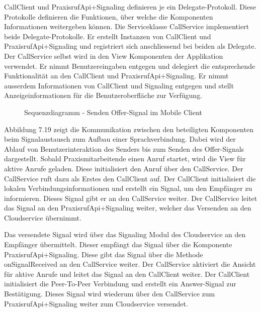 CallClient und PraxisrufApi+Signaling definieren je ein Delegate-Protokoll.
Diese Protokolle definieren die Funktionen, über welche die Komponenten Informationen weitergeben können.
Die Serviceklasse CallService implementiert beide Delegate-Protokolle.
Er erstellt Instanzen von CallClient und PraxisrufApi+Signaling und registriert sich anschliessend bei beiden als Delegate.
Der CallService selbst wird in den View Komponenten der Applikation verwendet.
Er nimmt Benutzereingaben entgegen und delegiert die entsprechende Funktionalität an den CallClient und PraxisrufApi+Signaling.
Er nimmt ausserdem Informationen von CallClient und Signaling entgegen und stellt Anzeigeinformationen für die Benutzeroberfläche zur Verfügung.
\clearpage
\begin{figure}[h]
    \centering
    \begin{minipage}[b]{0.9\textwidth}
        \caption{Sequenzdiagramm - Senden Offer-Signal im Mobile Client}
    \end{minipage}
\end{figure}

Abbildung 7.19 zeigt die Kommunikation zwischen den beteiligten Komponenten beim Signalaustausch zum Aufbau einer Sprachverbindung.
Dabei wird der Ablauf von Benutzerinteraktion des Senders bis zum Senden des Offer-Signals dargestellt.
Sobald Praxismitarbeitende einen Anruf startet, wird die View für aktive Anrufe geladen.
Diese initialisiert den Anruf über den CallService.
Der CallService ruft dazu als Erstes den CallClient auf.
Der CallClient initialisiert die lokalen Verbindungsinformationen und erstellt ein Signal, um den Empfänger zu informieren.
Dieses Signal gibt er an den CallService weiter.
Der CallService leitet das Signal an den PraxisrufApi+Signaling weiter, welcher das Versenden an den Cloudservice übernimmt.

Das versendete Signal wird über das Signaling Modul des Cloudservice an den Empfänger übermittelt.
Dieser empfängt das Signal über die Komponente PraxisrufApi+Signaling.
Diese gibt das Signal über die Methode onSignalReceived an den CallService weiter.
Der CallService aktiviert die Ansicht für aktive Anrufe und leitet das Signal an den CallClient weiter.
Der CallClient initialisiert die Peer-To-Peer Verbindung und erstellt ein Answer-Signal zur Bestätigung.
Dieses Signal wird wiederum über den CallService zum PraxisrufApi+Signaling weiter zum Cloudservice versendet.

\clearpage
